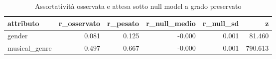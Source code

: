 \begin{table}
\centering
\caption{Assortatività osservata e attesa sotto null model a grado preservato}
\label{tab:t3_assortativita_globale}
\begin{tabular}{lrrrrr}
\toprule
    attributo &  r\_osservato &  r\_pesato &  r\_null\_medio &  r\_null\_sd &       z \\
\midrule
       gender &        0.081 &     0.125 &        -0.000 &      0.001 &  81.460 \\
musical\_genre &        0.497 &     0.667 &        -0.000 &      0.001 & 790.613 \\
\bottomrule
\end{tabular}
\end{table}
